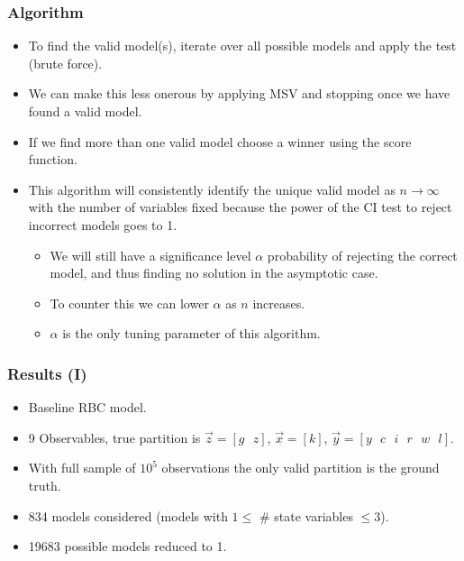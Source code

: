 \documentclass{beamer}
\begin{document}
\begin{frame}
    \frametitle{Algorithm}
    \begin{itemize}
        \item To find the valid model(s), iterate over all possible models and apply the test (brute force).
        \item We can make this less onerous by applying MSV and stopping once we have found a valid model.
        \item If we find more than one valid model choose a winner using the score function.
        \item This algorithm will consistently identify the unique valid model as $n \rightarrow \infty$ with the number of variables fixed because the power of the CI test to reject incorrect models goes to 1.
        \begin{itemize}
            \item We will still have a significance level $\alpha$ probability of rejecting the correct model, and thus finding no solution in the asymptotic case.
            \item To counter this we can lower $\alpha$ as $n$ increases. 
            \item $\alpha$ is the only tuning parameter of this algorithm.
        \end{itemize}
    \end{itemize}
\end{frame}

\begin{frame}
    \frametitle{Results (I)}
    \begin{itemize}
        \item Baseline RBC model.
        \item 9 Observables, true partition is $\vec{z} = [g \text{ } z]$, $\vec{x} = [k]$, $\vec{y} = [y \text{ } c \text{ } i \text{ } r \text{ } w \text{ } l]$.
        \item With full sample of $10^5$ observations the only valid partition is the ground truth.
        \item 834 models considered (models with $1 \leq$ \# state variables $\leq 3$).
        \item 19683 possible models reduced to 1.
    \end{itemize}
\end{frame}
\end{document}
